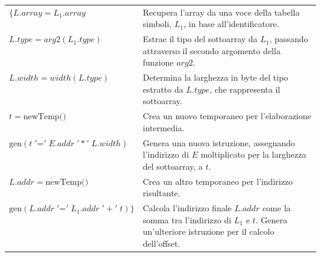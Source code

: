 \documentclass[11pt]{article}
\begin{document}
\begin{center}
  \begin{tabularx}{\linewidth}{l m{0.6\linewidth}}
  $\{L.array = L_1.array$
      & \small Recupera l'array da una voce della tabella simboli, $L_1$, in base all'identificatore. \\[0.3cm]
  
  $L.type = arg2(L_1.type)$
      & \small Estrae il tipo del sottoarray da $L_1$, passando attraverso il secondo argomento della funzione $arg2$. \\[0.3cm]
  
  $ L.width = width(L.type) $
      & \small Determina la larghezza in byte del tipo estratto da $L.type$, che rappresenta il sottoarray. \\[0.3cm]
  
  $ t = \text{newTemp()} $
      & \small Crea un nuovo temporaneo per l'elaborazione intermedia. \\[0.3cm]
  
  $ \text{gen}(t \;'\mathord{=}'\; E.addr \;'*'\; L.width)$
      & \small Genera una nuova istruzione, assegnando l'indirizzo di $E$ moltiplicato per la larghezza del sottoarray, a $t$. \\[0.3cm]
  
  $ L.addr = \text{newTemp()} $
      & \small Crea un altro temporaneo per l'indirizzo risultante. \\[0.3cm]
  
  $ \text{gen}(L.addr \;'\mathord{=}'\; L_1.addr \;'+'\; t )\}$
      & \small Calcola l'indirizzo finale $L.addr$ come la somma tra l'indirizzo di $L_1$ e $t$. Genera un'ulteriore istruzione per il calcolo dell'offset. \\
  \end{tabularx}  
\end{center}
\end{document}
